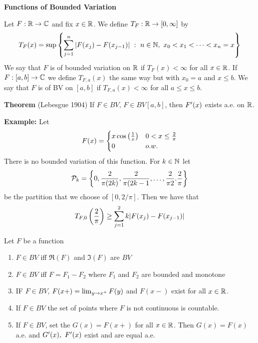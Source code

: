 \newpage
\begin{center}
    {\large \textbf{Functions of Bounded Variation}}
\end{center}

\vs

\dfn Let $F:\mathbb{R}\rightarrow \mathbb{C}$ and fix $x\in \mathbb{R}$. We define $T_F:\mathbb{R}\rightarrow [0, \infty]$ by
\[T_F(x) = \sup\left\{\sum_{j = 1}^n |F(x_j) - F(x_{j - 1})| \ :\ n\in \mathbb{N},\ x_0 < x_1< \cdots <x_n = x\right\}\]
We say that $F$ is of bounded variation on $\mathbb{R}$ if $T_F(x) < \infty$ for all $x\in \mathbb{R}$. If $F:[a,b]\rightarrow \mathbb{C}$ we define $T_{F,a}(x)$ the same way but with $x_0 = a$ and $x \leq b$. We say that $F$ is of BV on $[a,b]$ if $T_{F,a}(x) < \infty$ for all $a \leq x\leq b$.

\vs 

\textbf{Theorem} (Lebesgue 1904) If $F\in BV$, $F\in BV[a,b]$, then $F^\prime(x)$ exists a.e. on $\mathbb{R}$.

\vs

\textbf{Example:} Let 
\[F(x) = \begin{cases} x\cos\left(\frac{1}{x}\right) & 0 < x \leq \frac{2}{\pi}\\ 0 & o.w.\end{cases}\]
There is no bounded variation of this function. For $k\in \mathbb{N}$ let
\[\mathcal{P}_k = \left\{0, \frac{2}{\pi(2k)}, \frac{2}{\pi(2k - 1},\ldots, \frac{2}{\pi 2}. \frac{2}{\pi}\right\}\]
be the partition that we choose of $[0, 2/\pi]$. Then we have that
\begin{align*}
    T_{F, 0}\left(\frac{2}{\pi}\right) \geq 
    \sum_{j = 1}^2k | F(x_j) - F(x_{j - 1})|
\end{align*}

\vs

\setcounter{thm}{26}

\begin{thm}
Let $F$ be a function
\begin{enumerate}
    \item $F\in BV$ iff $\Re(F)$ and $\Im(F)$ are $BV$
    \item $F\in BV$ iff $F = F_1 - F_2$ where $F_1$ and $F_2$ are bounded and monotone
    \item IF $F\in BV$, $F(x+) = \lim_{y \rightarrow x^+} F(y)$ and $F(x-)$ exist for all $x\in \mathbb{R}$.
    \item If $F\in BV$ the set of points where $F$ is not continuous is countable.
    \item If $F\in BV$, set the $G(x) = F(x+)$ for all $x\in \mathbb{R}$. Then $G(x) = F(x)$ a.e. and $G^\prime(x),\ F^\prime(x)$ exist and are equal a.e.
\end{enumerate}
\end{thm}

